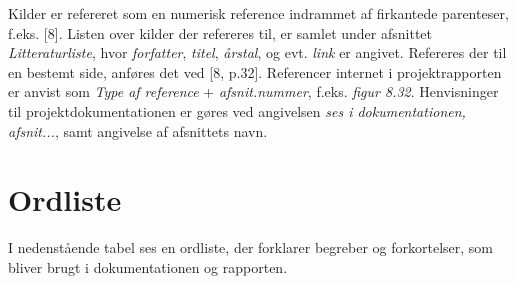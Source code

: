 Kilder er refereret som en numerisk reference indrammet af firkantede parenteser, f.eks. [8]. Listen over kilder der refereres til, er samlet under afsnittet \textit{Litteraturliste}, hvor \textit{forfatter}, \textit{titel}, \textit{årstal}, og evt. \textit{link} er angivet. Refereres der til en bestemt side, anføres det ved [8, p.32]. Referencer internet i projektrapporten er anvist som \textit{Type af reference} + \textit{afsnit.nummer}, f.eks. \textit{figur 8.32}. Henvisninger til projektdokumentationen er gøres ved  angivelsen \textit{ses i dokumentationen, afsnit...}, samt angivelse af afsnittets navn. 



\clearpage

\section{Ordliste}
I nedenstående tabel ses en ordliste, der forklarer begreber og forkortelser, som bliver brugt i dokumentationen og rapporten.
